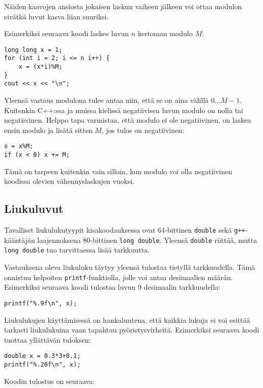 Näiden kaavojen ansiosta
jokaisen laskun vaiheen jälkeen voi ottaa modulon
eivätkä luvut kasva liian suuriksi.

Esimerkiksi seuraava koodi
laskee luvun $n$ kertoman modulo $M$:

\begin{lstlisting}
long long x = 1;
for (int i = 2; i <= n i++) {
    x = (x*i)%M;
}
cout << x << "\n";
\end{lstlisting}

Yleensä vastaus modulona tulee antaa niin,
että se on aina välillä $0\ldots M-1$.
Kuitenkin C++:ssa ja muissa
kielissä negatiivisen
luvun modulo on nolla tai negatiivinen.
Helppo tapa varmistaa, että modulo ei ole negatiivinen,
on laskea ensin modulo ja lisätä sitten $M$,
jos tulos on negatiivinen:

\begin{lstlisting}
x = x%M;
if (x < 0) x += M;
\end{lstlisting}
Tämä on tarpeen kuitenkin vain silloin,
kun modulo voi olla negatiivinen
koodissa olevien vähennyslaskujen vuoksi.

\subsection{Liukuluvut}


Tavalliset liukulukutyypit kisakoodauksessa
ovat 64-bittinen \texttt{double}
sekä \texttt{g++}-kääntäjän
laajennoksena
80-bittinen \texttt{long double}.
Yleensä \texttt{double} riittää,
mutta \texttt{long double} tuo tarvittaessa
lisää tarkkuutta.

Vastauksena oleva liukuluku täytyy yleensä tulostaa
tietyllä tarkkuudella.
Tämä onnistuu helpoiten \texttt{printf}-funktiolla,
jolle voi antaa desimaalien määrän.
Esimerkiksi seuraava koodi tulostaa luvun 9
desimaalin tarkkuudella:

\begin{lstlisting}
printf("%.9f\n", x);
\end{lstlisting}

Liukulukujen käyttämisessä on hankaluutena,
että kaikkia lukuja ei voi esittää tarkasti
liukulukuina vaan tapahtuu pyöristysvirheitä.
Esimerkiksi seuraava koodi tuottaa yllättävän tuloksen:

\begin{lstlisting}
double x = 0.3*3+0.1;
printf("%.20f\n", x);
\end{lstlisting}

Koodin tulostus on seuraava:

